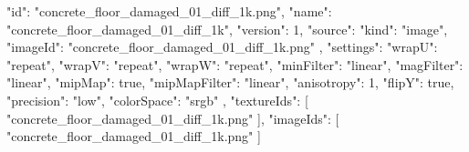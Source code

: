 {
  "id": "concrete_floor_damaged_01_diff_1k.png",
  "name": "concrete_floor_damaged_01_diff_1k",
  "version": 1,
  "source": {
    "kind": "image",
    "imageId": "concrete_floor_damaged_01_diff_1k.png"
  },
  "settings": {
    "wrapU": "repeat",
    "wrapV": "repeat",
    "wrapW": "repeat",
    "minFilter": "linear",
    "magFilter": "linear",
    "mipMap": true,
    "mipMapFilter": "linear",
    "anisotropy": 1,
    "flipY": true,
    "precision": "low",
    "colorSpace": "srgb"
  },
  "textureIds": [
    "concrete_floor_damaged_01_diff_1k.png"
  ],
  "imageIds": [
    "concrete_floor_damaged_01_diff_1k.png"
  ]
}
